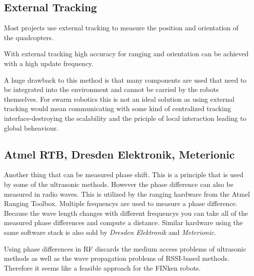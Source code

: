 \subsection{External Tracking}

Most projects use external tracking to measure the position and orientation of the quadcopters. 

With external tracking high accuracy for ranging and orientation can be achieved with a high update frequency.


A huge drawback to this method is that many components are used that need to be integrated into the environment and cannot be carried by the robots themselves.
For swarm robotics this is not an ideal solution as using external tracking would mean communicating with some kind of centralized tracking interface-destroying the scalability and the priciple of local interaction leading to global beheaviour.
\subsection{Atmel RTB, Dresden Elektronik, Meterionic}

Another thing that can be measured phase shift.
This is a principle that is used by some of the ultrasonic methods.
However the phase difference can also be measured in radio waves.
This is utilized by the ranging hardware from the Atmel Ranging Toolbox.
Multiple frequencys are used to measure a phase difference.
Because the wave length changes with different frequencys you can take all of the measured phase differences and compute a distance.
Similar hardware using the same software stack is also sold by \emph{Dresden Elektronik} and \emph{Meterionic}.

Using phase differences in RF discards the medium access problems of ultrasonic methods as well as the wave propagation problems of RSSI-based methods.
Therefore it seems like a feasible approach for the FINken robots.

